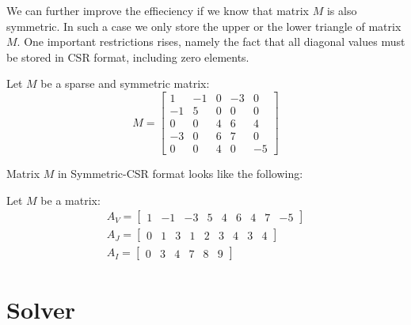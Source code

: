 \documentclass[en]{minipw} %
\begin{document}
We can further improve the effieciency if we know that matrix $M$ is also symmetric. In such a case we only store the upper or the lower triangle of matrix $M$. One important restrictions rises, namely the fact that all diagonal values must be stored in CSR format, including zero elements.

\begin{example}
Let $M$ be a sparse and symmetric matrix:
\begin{equation}
M =
\begin{bmatrix}
1 & -1 & 0 & -3 & 0 \\
-1 & 5 & 0 & 0 & 0 \\
0 & 0 & 4 & 6 & 4 \\
-3 & 0 & 6 & 7 & 0 \\
0 & 0 & 4 & 0 & -5
\end{bmatrix}
\end{equation}

Matrix $M$ in Symmetric-CSR format looks like the following:

Let $M$ be a matrix:
\begin{equation}
\begin{aligned}
A_{V} =
\begin{bmatrix}
1 & -1 & -3 & 5 & 4 & 6 & 4 & 7 & -5
\end{bmatrix}
\\
A_{J} =
\begin{bmatrix}
0 & 1 & 3 & 1 & 2 &3 & 4 & 3 & 4
\end{bmatrix}
\\
A_{I} =
\begin{bmatrix}
0 & 3 & 4 & 7 & 8 & 9
\end{bmatrix}
\end{aligned}
\end{equation}

\end{example}

\section{Solver}
\end{document}
